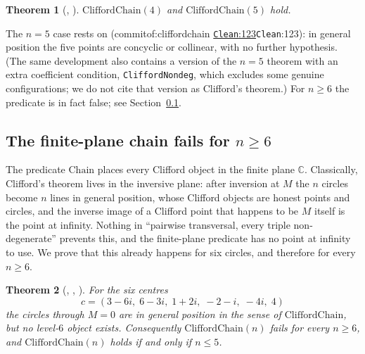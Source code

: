 \documentclass[11pt]{article}
\newtheorem{theorem}{Theorem}
\theoremstyle{definition}
\theoremstyle{remark}
\newcommand{\lean}[1]{\texttt{#1}}
\newcommand{\CC}{\mathbb{C}}
\newcommand{\commitof}[1]{\csname commitof:#1\endcsname}
\newcommand{\repo}[1]{https://github.com/jpbald93/#1}
\newcommand{\src}[4]{\ifcsname commitof:#1\endcsname
  \href{\repo{#1}/blob/\commitof{#1}/#2/#3.lean\#L#4}{\texttt{#3}:#4}\else\texttt{#3}:#4\fi}
\begin{document}
\begin{theorem}[, ]\label{thm:chain}
$\mathrm{CliffordChain}(4)$ and $\mathrm{CliffordChain}(5)$ hold.
\end{theorem}

The $n=5$ case rests on  (\src{cliffordchain}{Clifford}{Clean}{123}):
in general position the five points are concyclic or collinear, with no further hypothesis. (The
same development also contains a version of the $n=5$ theorem with an extra coefficient condition,
\lean{CliffordNondeg}, which excludes some genuine configurations; we do not cite that version as
Clifford's theorem.) For $n\ge6$ the predicate is in fact false; see Section~\ref{sec:chainfail}.

\subsection{The finite-plane chain fails for $n\ge6$}\label{sec:chainfail}
The predicate $\mathrm{Chain}$ places every Clifford object in the finite plane $\CC$. Classically,
Clifford's theorem lives in the inversive plane: after inversion at $M$ the $n$ circles become $n$ lines
in general position, whose Clifford objects are honest points and circles, and the inverse image of a
Clifford point that happens to be $M$ itself is the point at infinity. Nothing in ``pairwise transversal,
every triple non-degenerate'' prevents this, and the finite-plane predicate has no point at infinity to
use. We prove that this already happens for six circles, and therefore for every $n\ge6$.

\begin{theorem}[, , ]\label{thm:chainfail}
For the six centres
\[
  c=(3-6i,\;6-3i,\;1+2i,\;-2-i,\;-4i,\;4)
\]
the circles through $M=0$ are in general position in the sense of $\mathrm{CliffordChain}$, but no
level-$6$ object exists. Consequently $\mathrm{CliffordChain}(n)$ fails for every $n\ge6$, and
$\mathrm{CliffordChain}(n)$ holds if and only if $n\le5$.
\end{theorem}
\end{document}
